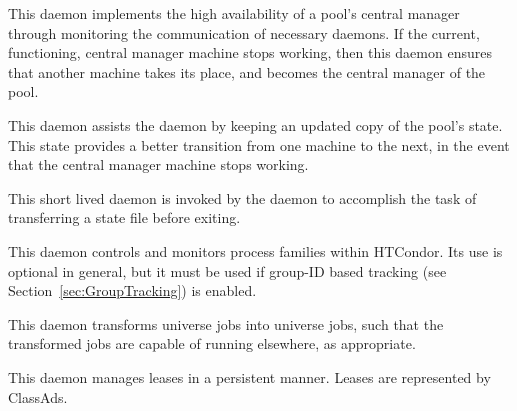\begin{description}
\item[\Condor{had}] This daemon
implements the high availability of a pool's central manager
through monitoring the communication of necessary daemons.
If the current, functioning, central manager machine
stops working, then this daemon ensures that another 
machine takes its place, and becomes the central manager of
the pool.

\item[\Condor{replication}] This daemon
assists the  daemon by keeping an updated copy of the
pool's state. This state provides a better transition
from one machine to the next, in the event 
that the central manager machine stops working.

\item[\Condor{transferer}] This short lived daemon is invoked by
the  daemon to accomplish the task of transferring
a state file before exiting.

\item[\Condor{procd}] This daemon
controls and monitors process families within HTCondor. Its use
is optional in general, but it must be used if 
group-ID based tracking (see Section~\ref{sec:GroupTracking}) is enabled.

\item[\Condor{job\_router}] This daemon 
transforms  universe jobs into 
universe jobs, such that the transformed jobs are capable
of running elsewhere, as appropriate.

\item[\Condor{lease\_manager}] This daemon 
manages leases in a persistent manner.
Leases are represented by ClassAds.


\end{description}
